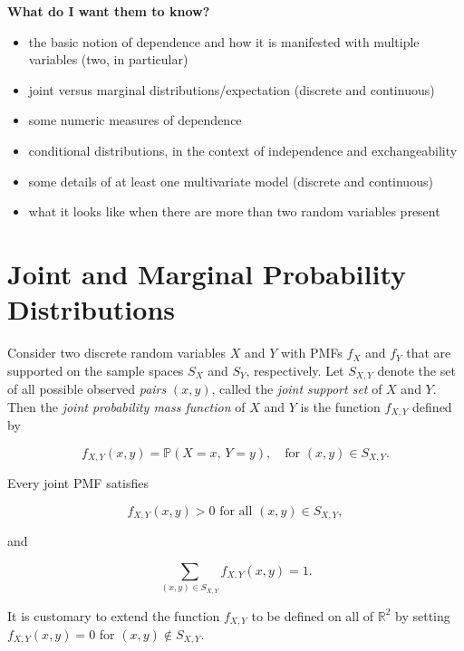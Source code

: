 \documentclass[]{book}
\providecommand{\tightlist}{%
  \setlength{\itemsep}{0pt}\setlength{\parskip}{0pt}}
\numberwithin{equation}{chapter}
\numberwithin{figure}{chapter}
\theoremstyle{plain}
\theoremstyle{definition}
\theoremstyle{remark}
\theoremstyle{definition}
\theoremstyle{definition}
\theoremstyle{remark}
\begin{document}
\textbf{What do I want them to know?}

\begin{itemize}
\tightlist
\item
  the basic notion of dependence and how it is manifested with multiple
  variables (two, in particular)
\item
  joint versus marginal distributions/expectation (discrete and
  continuous)
\item
  some numeric measures of dependence
\item
  conditional distributions, in the context of independence and
  exchangeability
\item
  some details of at least one multivariate model (discrete and
  continuous)
\item
  what it looks like when there are more than two random variables
  present
\end{itemize}

\section{Joint and Marginal Probability
Distributions}\label{sec-joint-probability-distributions}

Consider two discrete random variables \(X\) and \(Y\) with PMFs
\(f_{X}\) and \(f_{Y}\) that are supported on the sample spaces
\(S_{X}\) and \(S_{Y}\), respectively. Let \(S_{X,Y}\) denote the set of
all possible observed \emph{pairs} \((x,y)\), called the \emph{joint
support set} of \(X\) and \(Y\). Then the \emph{joint probability mass
function} of \(X\) and \(Y\) is the function \(f_{X,Y}\) defined by

\begin{equation}
\label{eq-joint-pmf}
f_{X,Y}(x,y)=\mathbb{P}(X=x,\, Y=y),\quad \mbox{for }(x,y)\in S_{X,Y}.
\end{equation}

Every joint PMF satisfies

\begin{equation}
f_{X,Y}(x,y)>0\mbox{ for all }(x,y)\in S_{X,Y},
\end{equation}

and

\begin{equation}
\sum_{(x,y)\in S_{X,Y}}f_{X,Y}(x,y)=1.
\end{equation}

It is customary to extend the function \(f_{X,Y}\) to be defined on all
of \(\mathbb{R}^{2}\) by setting \(f_{X,Y}(x,y)=0\) for
\((x,y)\not\in S_{X,Y}\).
\end{document}
